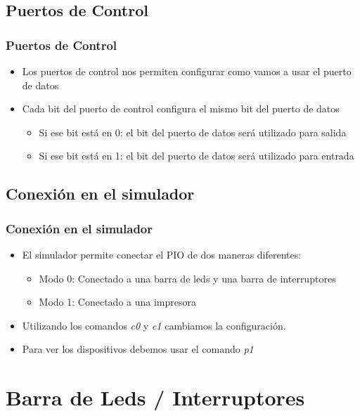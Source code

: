 \documentclass{beamer}
\begin{document}
\subsection{Puertos de Control}
\begin{frame}
\frametitle{Puertos de Control}
\begin{itemize}
 \item Los puertos de control nos permiten configurar como vamos a usar el puerto de datos
 \item Cada bit del puerto de control configura el mismo bit del puerto de datos
 \begin{itemize}
   \item Si ese bit está en 0: el bit del puerto de datos será utilizado para salida
   \item Si ese bit está en 1: el bit del puerto de datos será utilizado para entrada
 \end{itemize}
\end{itemize}

\end{frame}

\subsection{Conexión en el simulador}
\begin{frame}
\frametitle{Conexión en el simulador}
\begin{itemize}
  \item El simulador permite conectar el PIO de dos maneras diferentes:
  \begin{itemize}
    \item Modo 0: Conectado a una barra de leds y una barra de interruptores
    \item Modo 1: Conectado a una impresora
  \end{itemize}
  \item Utilizando los comandos \emph{c0} y \emph{c1} cambiamos la configuración.
  \item Para ver los dispositivos debemos usar el comando \emph{p1}
\end{itemize}
\end{frame}

\section{Barra de Leds / Interruptores}
\end{document}

